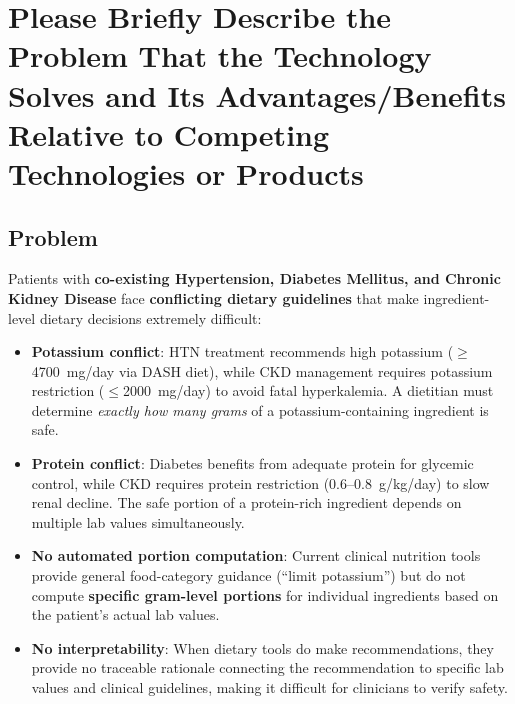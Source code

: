 \documentclass[a4paper,12pt]{article}
\begin{document}
\section*{Please Briefly Describe the Problem That the Technology Solves and Its Advantages/Benefits Relative to Competing Technologies or Products}

\subsection*{Problem}
Patients with \textbf{co-existing Hypertension, Diabetes Mellitus, and Chronic Kidney Disease} face \textbf{conflicting dietary guidelines} that make ingredient-level dietary decisions extremely difficult:
\begin{itemize}[itemsep=0.3em]
    \item \textbf{Potassium conflict}: HTN treatment recommends high potassium ($\geq$4700~mg/day via DASH diet), while CKD management requires potassium restriction ($\leq$2000~mg/day) to avoid fatal hyperkalemia. A dietitian must determine \textit{exactly how many grams} of a potassium-containing ingredient is safe.
    \item \textbf{Protein conflict}: Diabetes benefits from adequate protein for glycemic control, while CKD requires protein restriction (0.6--0.8~g/kg/day) to slow renal decline. The safe portion of a protein-rich ingredient depends on multiple lab values simultaneously.
    \item \textbf{No automated portion computation}: Current clinical nutrition tools provide general food-category guidance (``limit potassium'') but do not compute \textbf{specific gram-level portions} for individual ingredients based on the patient's actual lab values.
    \item \textbf{No interpretability}: When dietary tools do make recommendations, they provide no traceable rationale connecting the recommendation to specific lab values and clinical guidelines, making it difficult for clinicians to verify safety.
\end{itemize}
\end{document}
